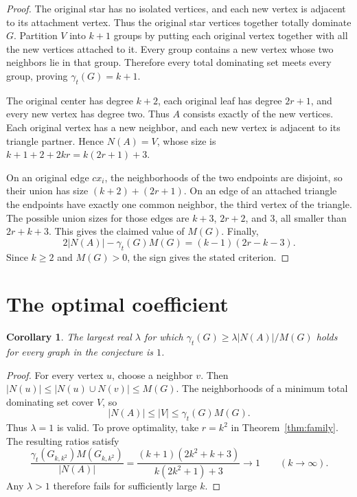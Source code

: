 \documentclass[11pt]{article}
\newtheorem{corollary}[theorem]{Corollary}
\newcommand{\gt}{\gamma_t}
\begin{document}
\begin{proof}
The original star has no isolated vertices, and each new vertex is
adjacent to its attachment vertex. Thus the original star vertices
together totally dominate \(G\). Partition \(V\) into \(k+1\) groups
by putting each original vertex together with all the new vertices
attached to it. Every group contains a new vertex whose two neighbors
lie in that group. Therefore every total dominating set meets every
group, proving \(\gt(G)=k+1\).

The original center has degree \(k+2\), each original leaf has degree
\(2r+1\), and every new vertex has degree two. Thus \(A\) consists
exactly of the new vertices. Each original vertex has a new neighbor,
and each new vertex is adjacent to its triangle partner. Hence
\(N(A)=V\), whose size is \(k+1+2+2kr=k(2r+1)+3\).

On an original edge \(cx_i\), the neighborhoods of the two endpoints
are disjoint, so their union has size \((k+2)+(2r+1)\).
On an edge of an attached triangle the endpoints have exactly one
common neighbor, the third vertex of the triangle. The possible union
sizes for those edges are \(k+3\), \(2r+2\), and \(3\), all smaller
than \(2r+k+3\). This gives the claimed value of \(M(G)\).
Finally,
\[
2|N(A)|-\gt(G)M(G)=(k-1)(2r-k-3).
\]
Since \(k\ge2\) and \(M(G)>0\), the sign gives the stated criterion.
\end{proof}

\section{The optimal coefficient}

\begin{corollary}
The largest real \(\lambda\) for which
\(\gt(G)\ge \lambda|N(A)|/M(G)\) holds for every graph in the conjecture
is \(1\).
\end{corollary}

\begin{proof}
For every vertex \(u\), choose a neighbor \(v\). Then
\(|N(u)|\le |N(u)\cup N(v)|\le M(G)\). The neighborhoods of a minimum
total dominating set cover \(V\), so
\[
|N(A)|\le |V|\le \gt(G)M(G).
\]
Thus \(\lambda=1\) is valid.
To prove optimality, take \(r=k^2\) in Theorem~\ref{thm:family}.
The resulting ratios satisfy
\[
\frac{\gt(G_{k,k^2})M(G_{k,k^2})}{|N(A)|}
=\frac{(k+1)(2k^2+k+3)}{k(2k^2+1)+3}
\longrightarrow 1
\qquad(k\to\infty).
\]
Any \(\lambda>1\) therefore fails for sufficiently large \(k\).
\end{proof}
\end{document}
